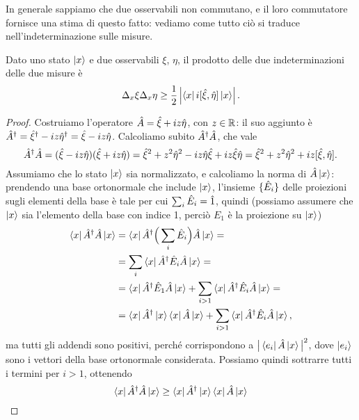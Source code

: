 In generale sappiamo che due osservabili non commutano, e il loro commutatore fornisce una stima di questo fatto: vediamo come tutto ciò si traduce nell'indeterminazione sulle misure.
\begin{teorema} \label{t:indeterminazione}
	Dato uno stato $\left|{x}\right\rangle$ e due osservabili $\xi$, $\eta$, il prodotto delle due indeterminazioni delle due misure è
	\begin{equation}
		\Delta_x\xi\Delta_x\eta\geq\frac12\left|{\left\langle{x}\right|i[\hat{\xi},\hat{\eta}]\left|{x}\right\rangle}\right|.
		\label{eq:indeterminazione}
	\end{equation}
\end{teorema}
\begin{proof}
	Costruiamo l'operatore $\hat{A}=\hat{\xi}+iz\hat{\eta}$, con $z\in\mathbb{R}$: il suo aggiunto è ${\hat{A}}^\dagger={\hat{\xi}}^\dagger-iz{\hat{\eta}}^\dagger=\hat{\xi}-iz\hat{\eta}$.
	Calcoliamo subito ${\hat{A}}^\dagger\hat{A}$, che vale
	\begin{equation}
		{\hat{A}}^\dagger\hat{A}=(\hat{\xi}-iz\hat{\eta})(\hat{\xi}+iz\hat{\eta})=\hat{\xi}^2+z^2\hat{\eta}^2-iz\hat{\eta}\hat{\xi}+iz\hat{\xi}\hat{\eta}=\hat{\xi}^2+z^2\hat{\eta}^2+iz[\hat{\xi},\hat{\eta}].
	\end{equation}
	Assumiamo che lo stato $\left|{x}\right\rangle$ sia normalizzato, e calcoliamo la norma di $\hat{A}\left|{x}\right\rangle$: prendendo una base ortonormale che include $\left|{x}\right\rangle$, l'insieme $\{\hat{E}_i\}$ delle proiezioni sugli elementi della base è tale per cui $\sum_i\hat{E}_i=\hat{1}$, quindi (possiamo assumere che $\left|{x}\right\rangle$ sia l'elemento della base con indice 1, perciò $E_1$ è la proiezione su $\left|{x}\right\rangle$)
	\begin{equation}
		\begin{split}
			\left\langle{x}\right|{\hat{A}}^\dagger\hat{A}\left|{x}\right\rangle&=\left\langle{x}\right|{\hat{A}}^\dagger\Big(\sum_i\hat{E}_i\Big)\hat{A}\left|{x}\right\rangle=\\
			&=\sum_i\left\langle{x}\right|{\hat{A}}^\dagger\hat{E}_i\hat{A}\left|{x}\right\rangle=\\
			&=\left\langle{x}\right|{\hat{A}}^\dagger\hat{E}_1\hat{A}\left|{x}\right\rangle+\sum_{i>1}\left\langle{x}\right|{\hat{A}}^\dagger\hat{E}_i\hat{A}\left|{x}\right\rangle=\\
			&=\left\langle{x}\right|{\hat{A}}^\dagger\left|{x}\right\rangle\left\langle{x}\right|\hat{A}\left|{x}\right\rangle+\sum_{i>1}\left\langle{x}\right|{\hat{A}}^\dagger\hat{E}_i\hat{A}\left|{x}\right\rangle,
		\end{split}
	\end{equation}
	ma tutti gli addendi sono positivi, perch\'e corrispondono a $\big|\left\langle{e_i}\right|\hat{A}\left|{x}\right\rangle\big|^2$, dove $\left|{e_i}\right\rangle$ sono i vettori della base ortonormale considerata.
	Possiamo quindi sottrarre tutti i termini per $i>1$, ottenendo
	\begin{equation}
		\left\langle{x}\right|{\hat{A}}^\dagger\hat{A}\left|{x}\right\rangle\geq\left\langle{x}\right|{\hat{A}}^\dagger\left|{x}\right\rangle\left\langle{x}\right|\hat{A}\left|{x}\right\rangle
	\end{equation}

\end{proof}
